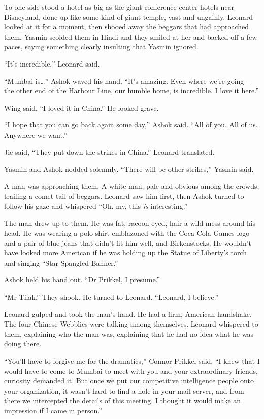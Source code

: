To one side stood a hotel as big as the giant conference center
hotels near Disneyland, done up like some kind of giant temple,
vast and ungainly. Leonard looked at it for a moment, then shooed
away the beggars that had approached them. Yasmin scolded them in
Hindi and they smiled at her and backed off a few paces, saying
something clearly insulting that Yasmin ignored.

``It's incredible,'' Leonard said.

``Mumbai is\ldots{}'' Ashok waved his hand. ``It's amazing. Even where
we're going -- the other end of the Harbour Line, our humble home,
is incredible. I love it here.''

Wing said, ``I loved it in China.'' He looked grave.

``I hope that you can go back again some day,'' Ashok said. ``All of
you. All of us. Anywhere we want.''

Jie said, ``They put down the strikes in China.'' Leonard
translated.

Yasmin and Ashok nodded solemnly. ``There will be other strikes,''
Yasmin said.

A man was approaching them. A white man, pale and obvious among the
crowds, trailing a comet-tail of beggars. Leonard saw him first,
then Ashok turned to follow his gaze and whispered ``Oh, my, this
\emph{is} interesting.''

The man drew up to them. He was fat, racoon-eyed, hair a wild mess
around his head. He was wearing a polo shirt emblazoned with the
Coca-Cola Games logo and a pair of blue-jeans that didn't fit him
well, and Birkenstocks. He wouldn't have looked more American if he
was holding up the Statue of Liberty's torch and singing ``Star
Spangled Banner.''

Ashok held his hand out. ``Dr Prikkel, I presume.''

``Mr Tilak.'' They shook. He turned to Leonard. ``Leonard, I
believe.''

Leonard gulped and took the man's hand. He had a firm, American
handshake. The four Chinese Webblies were talking among themselves.
Leonard whispered to them, explaining who the man was, explaining
that he had no idea what he was doing there.

``You'll have to forgive me for the dramatics,'' Connor Prikkel said.
``I knew that I would have to come to Mumbai to meet with you and
your extraordinary friends, curiosity demanded it. But once we put
our competitive intelligence people onto your organization, it
wasn't hard to find a hole in your mail server, and from there we
intercepted the details of this meeting. I thought it would make an
impression if I came in person.''

